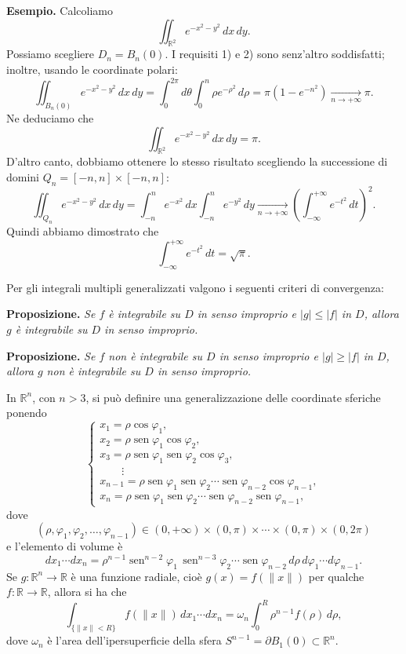 \documentclass[11pt,a4paper]{article}
\newcommand{\R}{\mathbb{R}}
\newcommand{\sen}{\operatorname{sen}}
\newcommand{\result}[2]{\par\medskip\noindent\textbf{#1} \textit{#2}\par}
\begin{document}
\noindent\textbf{Esempio.} Calcoliamo
\[
\iint_{\R^2}e^{-x^2-y^2}\,dx\,dy.
\]
Possiamo scegliere $D_n=B_n(0)$. I requisiti 1) e 2) sono senz'altro soddisfatti; inoltre, usando le coordinate polari:
\[
\iint_{B_n(0)}e^{-x^2-y^2}\,dx\,dy
=\int_0^{2\pi}d\theta\int_0^n\rho e^{-\rho^2}\,d\rho
=\pi\left(1-e^{-n^2}\right)\xrightarrow[n\to+\infty]{}\pi.
\]
Ne deduciamo che
\[
\iint_{\R^2}e^{-x^2-y^2}\,dx\,dy=\pi.
\]
D'altro canto, dobbiamo ottenere lo stesso risultato scegliendo la successione di domini $Q_n=[-n,n]\times[-n,n]$:
\[
\iint_{Q_n}e^{-x^2-y^2}\,dx\,dy
=\int_{-n}^{n}e^{-x^2}\,dx\int_{-n}^{n}e^{-y^2}\,dy
\xrightarrow[n\to+\infty]{}
\left(\int_{-\infty}^{+\infty}e^{-t^2}\,dt\right)^2.
\]
Quindi abbiamo dimostrato che
\[
\int_{-\infty}^{+\infty}e^{-t^2}\,dt=\sqrt\pi.
\]

Per gli integrali multipli generalizzati valgono i seguenti criteri di convergenza:

\result{Proposizione.}{Se $f$ è integrabile su $D$ in senso improprio e $|g|\le|f|$ in $D$, allora $g$ è integrabile su $D$ in senso improprio.}

\result{Proposizione.}{Se $f$ non è integrabile su $D$ in senso improprio e $|g|\ge|f|$ in $D$, allora $g$ non è integrabile su $D$ in senso improprio.}

In $\R^n$, con $n>3$, si può definire una generalizzazione delle coordinate sferiche ponendo
\[
\begin{cases}
x_1=\rho\cos\varphi_1,\\
x_2=\rho\sen\varphi_1\cos\varphi_2,\\
x_3=\rho\sen\varphi_1\sen\varphi_2\cos\varphi_3,\\
\qquad\vdots\\
x_{n-1}=\rho\sen\varphi_1\sen\varphi_2\cdots\sen\varphi_{n-2}\cos\varphi_{n-1},\\
x_n=\rho\sen\varphi_1\sen\varphi_2\cdots\sen\varphi_{n-2}\sen\varphi_{n-1},
\end{cases}
\]
dove
\[
(\rho,\varphi_1,\varphi_2,\ldots,\varphi_{n-1})
\in(0,+\infty)\times(0,\pi)\times\cdots\times(0,\pi)\times(0,2\pi)
\]
e l'elemento di volume è
\[
dx_1\cdots dx_n
=\rho^{n-1}\sen^{n-2}\varphi_1\,\sen^{n-3}\varphi_2\cdots\sen\varphi_{n-2}\,d\rho\,d\varphi_1\cdots d\varphi_{n-1}.
\]
Se $g:\R^n\to\R$ è una funzione radiale, cioè $g(x)=f(\lVert x\rVert)$ per qualche $f:\R\to\R$, allora si ha che
\[
\int_{\{\lVert x\rVert<R\}}f(\lVert x\rVert)\,dx_1\cdots dx_n
=\omega_n\int_0^R\rho^{n-1}f(\rho)\,d\rho,
\]
dove $\omega_n$ è l'area dell'ipersuperficie della sfera $S^{n-1}=\partial B_1(0)\subset\R^n$.
\end{document}
